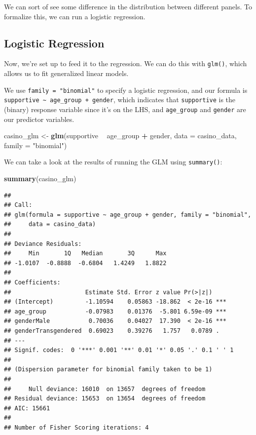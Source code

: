 \documentclass[
]{book}
\newenvironment{Shaded}{\begin{snugshade}}{\end{snugshade}}
\newcommand{\DataTypeTok}[1]{\textcolor[rgb]{0.13,0.29,0.53}{#1}}
\newcommand{\KeywordTok}[1]{\textcolor[rgb]{0.13,0.29,0.53}{\textbf{#1}}}
\newcommand{\NormalTok}[1]{#1}
\newcommand{\OperatorTok}[1]{\textcolor[rgb]{0.81,0.36,0.00}{\textbf{#1}}}
\newcommand{\StringTok}[1]{\textcolor[rgb]{0.31,0.60,0.02}{#1}}
\begin{document}
We can sort of see some difference in the distribution between different panels. To formalize this, we can run a logistic regression.

\hypertarget{logistic-regression}{%
\subsection{Logistic Regression}\label{logistic-regression}}

Now, we're set up to feed it to the regression. We can do this with \texttt{glm()}, which allows us to fit generalized linear models.

We use \texttt{family\ =\ "binomial"} to specify a logistic regression, and our formula is \texttt{supportive\ \textasciitilde{}\ age\_group\ +\ gender}, which indicates that \texttt{supportive} is the (binary) response variable since it's on the LHS, and \texttt{age\_group} and \texttt{gender} are our predictor variables.

\begin{Shaded}
\begin{Highlighting}[]
\NormalTok{casino_glm <-}\StringTok{ }\KeywordTok{glm}\NormalTok{(supportive }\OperatorTok{~}\StringTok{ }\NormalTok{age_group }\OperatorTok{+}\StringTok{ }\NormalTok{gender, }\DataTypeTok{data =}\NormalTok{ casino_data, }\DataTypeTok{family =} \StringTok{"binomial"}\NormalTok{)}
\end{Highlighting}
\end{Shaded}

We can take a look at the results of running the GLM using \texttt{summary()}:

\begin{Shaded}
\begin{Highlighting}[]
\KeywordTok{summary}\NormalTok{(casino_glm)}
\end{Highlighting}
\end{Shaded}

\begin{verbatim}
## 
## Call:
## glm(formula = supportive ~ age_group + gender, family = "binomial", 
##     data = casino_data)
## 
## Deviance Residuals: 
##     Min       1Q   Median       3Q      Max  
## -1.0107  -0.8888  -0.6804   1.4249   1.8822  
## 
## Coefficients:
##                     Estimate Std. Error z value Pr(>|z|)    
## (Intercept)         -1.10594    0.05863 -18.862  < 2e-16 ***
## age_group           -0.07983    0.01376  -5.801 6.59e-09 ***
## genderMale           0.70036    0.04027  17.390  < 2e-16 ***
## genderTransgendered  0.69023    0.39276   1.757   0.0789 .  
## ---
## Signif. codes:  0 '***' 0.001 '**' 0.01 '*' 0.05 '.' 0.1 ' ' 1
## 
## (Dispersion parameter for binomial family taken to be 1)
## 
##     Null deviance: 16010  on 13657  degrees of freedom
## Residual deviance: 15653  on 13654  degrees of freedom
## AIC: 15661
## 
## Number of Fisher Scoring iterations: 4
\end{verbatim}
\end{document}
